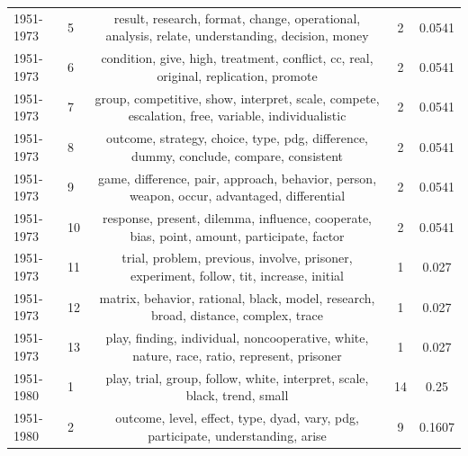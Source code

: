 \documentclass{article}
\theoremstyle{definition}
\begin{document}
\begin{table}[!hbtp]
\begin{center}
{\begin{tabular}{llccc}
             1951-1973 &               5 &               result, research, format, change, operational, analysis, relate, understanding, decision, money &                2 &                  0.0541 \\
             1951-1973 &               6 &                          condition, give, high, treatment, conflict, cc, real, original, replication, promote &                2 &                  0.0541 \\
             1951-1973 &               7 &              group, competitive, show, interpret, scale, compete, escalation, free, variable, individualistic &                2 &                  0.0541 \\
             1951-1973 &               8 &                        outcome, strategy, choice, type, pdg, difference, dummy, conclude, compare, consistent &                2 &                  0.0541 \\
             1951-1973 &               9 &                   game, difference, pair, approach, behavior, person, weapon, occur, advantaged, differential &                2 &                  0.0541 \\
             1951-1973 &              10 &                    response, present, dilemma, influence, cooperate, bias, point, amount, participate, factor &                2 &                  0.0541 \\
             1951-1973 &              11 &                       trial, problem, previous, involve, prisoner, experiment, follow, tit, increase, initial &                1 &                   0.027 \\
             1951-1973 &              12 &                           matrix, behavior, rational, black, model, research, broad, distance, complex, trace &                1 &                   0.027 \\
             1951-1973 &              13 &                    play, finding, individual, noncooperative, white, nature, race, ratio, represent, prisoner &                1 &                   0.027 \\
             \midrule
             1951-1980 &               1 &                                      play, trial, group, follow, white, interpret, scale, black, trend, small &               14 &                    0.25 \\
             1951-1980 &               2 &                              outcome, level, effect, type, dyad, vary, pdg, participate, understanding, arise &                9 &                  0.1607 \\

\end{tabular}}
\end{center}
\end{table}
\end{document}
